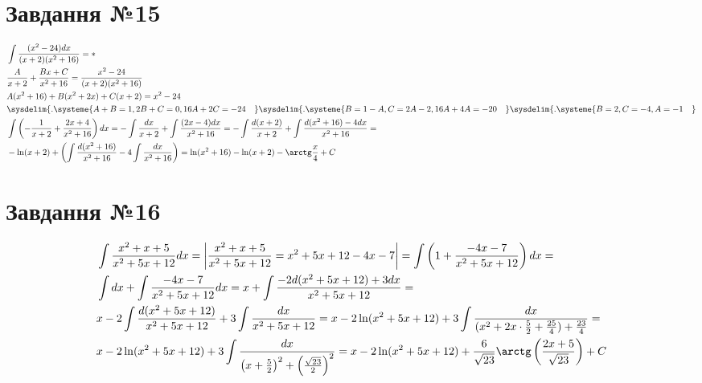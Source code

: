 \documentclass{report}
\begin{document}
\section{Завдання №15}
\begin{equation}\label{eq15}\begin{split}
	&\int\frac{(x^2 - 24)dx}{(x+2)(x^2 + 16)} = \ast \\
	& \frac{A}{x+2} + \frac{Bx + C}{x^2 + 16} = \frac{x^2 - 24}{(x+2)(x^2 + 16)}\\
	& A(x^2 + 16) + B(x^2 + 2x) + C(x + 2) = x^2 - 24\\
	& \sysdelim\{.\systeme{A + B = 1, 2B + C = 0, 16A + 2C = -24\quad} \sysdelim\{.\systeme{B = 1 - A, C = 2A - 2, 16A + 4A = -20\quad} \sysdelim\{.\systeme{B = 2, C = -4, A = -1\quad}\\
	& \int\left(-\frac{1}{x + 2} + \frac{2x + 4}{x^2 + 16}\right)dx = -\int\frac{dx}{x + 2} + \int\frac{(2x - 4)dx}{x^2 + 16} = -\int\frac{d(x + 2)}{x + 2} + \int\frac{d(x^2 + 16) - 4dx}{x^2 + 16} =\\
	& -\ln(x+2) + \left(\int\frac{d(x^2 + 16)}{x^2 + 16} - 4\int\frac{dx}{x^2 + 16}\right) = \ln(x^2 + 16) - \ln(x+2) - \arctg\frac{x}{4} + C
\end{split}\end{equation}

\section{Завдання №16}
\begin{equation}\label{eq16}\begin{split}
	& \int\frac{x^2 + x + 5}{x^2 + 5x + 12} dx = \left\lvert\frac{x^2 + x + 5}{x^2 + 5x + 12} = x^2 + 5x + 12 - 4x - 7\right\rvert = \int\left(1 + \frac{-4x-7}{x^2 + 5x + 12}\right)dx =\\
	& \int dx + \int\frac{-4x-7}{x^2 + 5x + 12}dx = x + \int\frac{-2d(x^2 + 5x + 12) + 3dx}{x^2 + 5x + 12} =\\
	& x - 2\int\frac{d(x^2 + 5x + 12)}{x^2 + 5x + 12} + 3\int\frac{dx}{x^2 + 5x + 12} = x - 2\ln(x^2 + 5x + 12) + 3\int\frac{dx}{(x^2 + 2x \cdot \frac{5}{2} + \frac{25}{4}) + \frac{23}{4}} =\\
	& x - 2\ln(x^2 + 5x + 12) + 3\int\frac{dx}{\left(x + \frac{5}{2}\right)^2 + \left(\frac{\sqrt{23}}{2}\right)^2} = x - 2\ln(x^2 + 5x + 12) + \frac{6}{\sqrt{23}}\arctg\left(\frac{2x + 5}{\sqrt{23}}\right) + C
\end{split}\end{equation}
\end{document}
